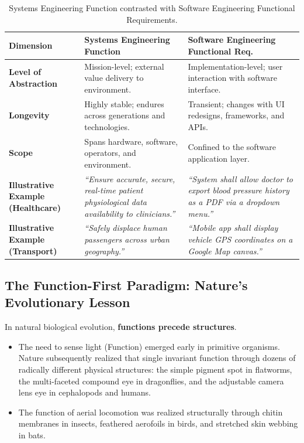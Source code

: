 \begin{table}[htbp]
\centering
\small
\renewcommand{\arraystretch}{1.3}
\begin{tabularx}{\textwidth}{p{3.5cm}p{5.5cm}X}
\toprule
\textbf{Dimension} & \textbf{Systems Engineering Function} & \textbf{Software Engineering Functional Req.} \\
\midrule
\textbf{Level of Abstraction} & Mission-level; external value delivery to environment. & Implementation-level; user interaction with software interface. \\
\textbf{Longevity} & Highly stable; endures across generations and technologies. & Transient; changes with UI redesigns, frameworks, and APIs. \\
\textbf{Scope} & Spans hardware, software, operators, and environment. & Confined to the software application layer. \\
\textbf{Illustrative Example (Healthcare)} & \textit{``Ensure accurate, secure, real-time patient physiological data availability to clinicians.''} & \textit{``System shall allow doctor to export blood pressure history as a PDF via a dropdown menu.''} \\
\textbf{Illustrative Example (Transport)} & \textit{``Safely displace human passengers across urban geography.''} & \textit{``Mobile app shall display vehicle GPS coordinates on a Google Map canvas.''} \\
\bottomrule
\end{tabularx}
\caption{Systems Engineering Function contrasted with Software Engineering Functional Requirements.}
\label{tab:se_vs_swe_function}
\end{table}

\subsection{The Function-First Paradigm: Nature's Evolutionary Lesson}
In natural biological evolution, \textbf{functions precede structures}. 
\begin{itemize}[leftmargin=1.5em]
    \item The need to sense light (Function) emerged early in primitive organisms. Nature subsequently realized that single invariant function through dozens of radically different physical structures: the simple pigment spot in flatworms, the multi-faceted compound eye in dragonflies, and the adjustable camera lens eye in cephalopods and humans.
    \item The function of aerial locomotion was realized structurally through chitin membranes in insects, feathered aerofoils in birds, and stretched skin webbing in bats.
\end{itemize}

